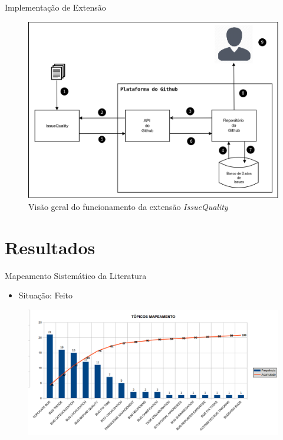 \documentclass[t,14pt,mathserif]{beamer}
\begin{document}
\begin{frame}{Implementação de Extensão}

    \begin{figure}[htpb]
        \centering
        \includegraphics[width=0.7\linewidth]{../img/diagrama_funcionamento_issuequality.png}
        \caption{Visão geral do funcionamento da extensão \textit{IssueQuality}}
\label{fig:diagrama_funcionamento_issuequality}
    \end{figure}
\end{frame}

\section{Resultados}

\begin{frame}{Mapeamento Sistemático da Literatura}
	\begin{itemize}
		\item Situação: Feito
    \end{itemize}

	\begin{figure}[hbtp]
		\centering
		\includegraphics[scale=.39]{../img/mapeamento.png}
	\end{figure}
\end{frame}
\end{document}
